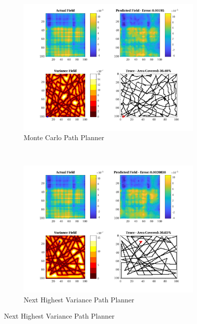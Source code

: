 \begin{figure}[htb!]
    \centering
    \begin{subfigure}[t]{0.5\textwidth}
        \centering
        \includegraphics[width=\linewidth]{figures/hbresults/mc_30p_100x100_sf_100_seed_2.png}
        \captionsetup{skip=0.10\baselineskip,size=footnotesize}
        \caption{Monte Carlo Path Planner}
    \end{subfigure}%
    ~ 
    \begin{subfigure}[t]{0.5\textwidth}
        \centering
        \includegraphics[width=\linewidth]{figures/hbresults/nhv_30p_100x100_sf_100_seed_2.png}
        \captionsetup{skip=0.10\baselineskip,size=footnotesize}
        \caption{Next Highest Variance Path Planner}

\end{subfigure}
\end{figure}
